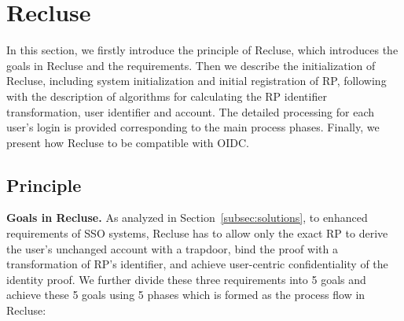 \section{Recluse}
\label{sec:Recluse}
In this section, we firstly introduce the principle of Recluse, which introduces the goals in Recluse and the requirements. Then we describe the initialization of Recluse, including system initialization and initial registration of RP, following with the description of algorithms for calculating the RP identifier transformation, user identifier and account. The detailed processing for each user's login is provided corresponding to the main process phases. Finally, we present how Recluse to be compatible with OIDC.

\subsection{Principle}
\noindent\textbf{Goals in Recluse.} As analyzed in Section~\ref{subsec:solutions}, to enhanced requirements of SSO systems, Recluse has to allow only the exact RP to derive the user's unchanged account with a trapdoor, bind the proof with a transformation of RP’s identifier, and achieve user-centric confidentiality of the identity proof. We further divide these three requirements into 5 goals and achieve these 5 goals using 5 phases which is formed as the process flow in Recluse:
